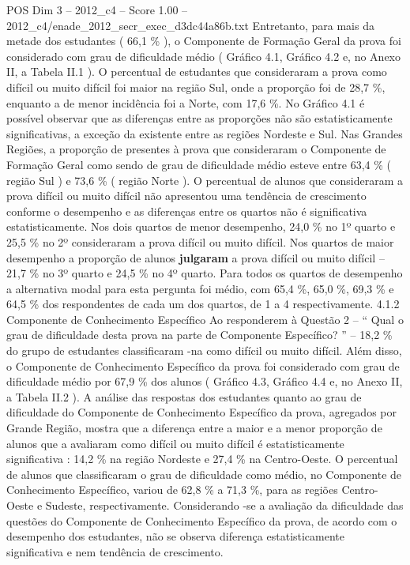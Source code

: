 \begin{textsample}{POS Dim 3 – 2012\_c4 – Score 1.00 – 2012\_c4/enade\_2012\_secr\_exec\_d3dc44a86b.txt}
Entretanto, para mais da metade dos estudantes ( 66,1 \% ), o Componente de Formação Geral da prova foi considerado com grau de dificuldade médio ( Gráfico 4.1, Gráfico 4.2 e, no Anexo II, a Tabela II.1 ).
O percentual de estudantes que consideraram a prova como difícil ou muito difícil foi maior na região Sul, onde a proporção foi de 28,7 \%, enquanto a de menor incidência foi a Norte, com 17,6 \%.
No Gráfico 4.1 é possível observar que as diferenças entre as proporções não são estatisticamente significativas, a exceção da existente entre as regiões Nordeste e Sul.
Nas Grandes Regiões, a proporção de presentes à prova que consideraram o Componente de Formação Geral como sendo de grau de dificuldade médio esteve entre 63,4 \% ( região Sul ) e 73,6 \% ( região Norte ).
O percentual de alunos que consideraram a prova difícil ou muito difícil não apresentou uma tendência de crescimento conforme o desempenho e as diferenças entre os quartos não é significativa estatisticamente.
Nos dois quartos de menor desempenho, 24,0 \% no 1º quarto e 25,5 \% no 2º consideraram a prova difícil ou muito difícil.
Nos quartos de maior desempenho a proporção de alunos \textbf{julgaram} a prova difícil ou muito difícil – 21,7 \% no 3º quarto e 24,5 \% no 4º quarto.
Para todos os quartos de desempenho a alternativa modal para esta pergunta foi médio, com 65,4 \%, 65,0 \%, 69,3 \% e 64,5 \% dos respondentes de cada um dos quartos, de 1 a 4 respectivamente. 4.1.2 Componente de Conhecimento Específico Ao responderem à Questão 2 – “ Qual o grau de dificuldade desta prova na parte de Componente Específico? ” – 18,2 \% do grupo de estudantes classificaram -na como difícil ou muito difícil.
Além disso, o Componente de Conhecimento Específico da prova foi considerado com grau de dificuldade médio por 67,9 \% dos alunos ( Gráfico 4.3, Gráfico 4.4 e, no Anexo II, a Tabela II.2 ).
A análise das respostas dos estudantes quanto ao grau de dificuldade do Componente de Conhecimento Específico da prova, agregados por Grande Região, mostra que a diferença entre a maior e a menor proporção de alunos que a avaliaram como difícil ou muito difícil é estatisticamente significativa : 14,2 \% na região Nordeste e 27,4 \% na Centro-Oeste.
O percentual de alunos que classificaram o grau de dificuldade como médio, no Componente de Conhecimento Específico, variou de 62,8 \% a 71,3 \%, para as regiões Centro-Oeste e Sudeste, respectivamente.
Considerando -se a avaliação da dificuldade das questões do Componente de Conhecimento Específico da prova, de acordo com o desempenho dos estudantes, não se observa diferença estatisticamente significativa e nem tendência de crescimento.

\end{textsample}
